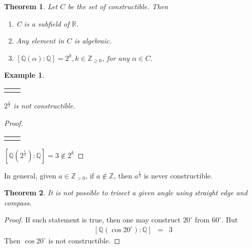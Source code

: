 \documentclass{article}
\theoremstyle{MyNonumberplain}
\theoremstyle{break}
\newtheorem*{proof}{Proof. }
\newcommand{\nline}{\begin{tabular}{ll}&\\\end{tabular}}
\newcommand{\nin}{\not\in}
\theoremstyle{break}
\newtheorem{theorem}{Theorem}[section]
\newtheorem{example}{Example}[section]
\theoremstyle{break}
\theoremstyle{definition}
\theoremstyle{break}
\begin{document}
\begin{thmbox}
    \begin{theorem}
        Let $C$ be the set of constructible. Then\\

        \begin{enumerate}
            \item C is a subfield of $\mathbb{R}$.\\
            \item Any element in $C$ is algebraic.\\
            \item $[\mathbb{Q} (\alpha) : \mathbb{Q}] = 2^k, k \in \mathbb{Z}_{\geq 0}$, for
            any $\alpha \in C$.
        \end{enumerate}
    \end{theorem}
\end{thmbox}

\begin{expbox}
    \begin{example}
        \nline

        $2^{\frac{1}{3}}$ is not constructible.
    \end{example}
    \begin{prfbox}
        \begin{proof}

            \nline

            $\left[ \mathbb{Q} \left( 2^{\frac{1}{3}} \right) : \mathbb{Q} \right] = 3
            \nin 2^k$
        \end{proof}
    \end{prfbox}
    In general, given $a \in \mathbb{Z}_{> 0}$, if $a \nin \mathbb{Z}$, then
$a^{\frac{1}{3}}$ is never constructible.
\end{expbox}

\begin{thmbox}
    \begin{theorem}
        It is not possible to trisect a given angle using straight edge and compass.
    \end{theorem}
    \begin{prfbox}
        \begin{proof}
            If such statement is true, then one may construct $20^{\circ}$ from
            $60^{\circ}$. But
            \begin{eqnarray*}
              {}[\mathbb{Q} (\cos 20^{\circ}) : \mathbb{Q}] & = & 3
            \end{eqnarray*}
            Then $\cos 20^{\circ}$ is not constructible.
        \end{proof}
    \end{prfbox}
\end{thmbox}
\end{document}
